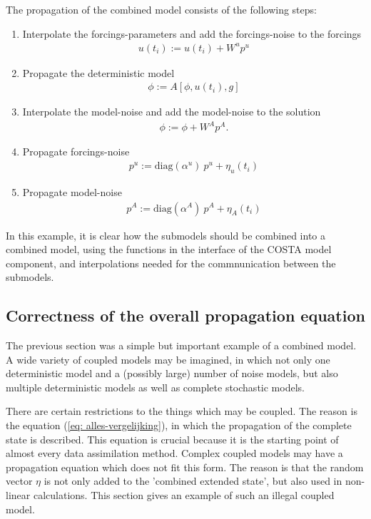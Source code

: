 \documentclass[a4paper,12pt]{article}
\begin{document}
The propagation of the combined model consists of the following steps:
\begin{enumerate}
 \item Interpolate the forcings-parameters and add the forcings-noise to
       the forcings
    \begin{eqnarray}
       u(t_i) := u(t_i) + W^u p^u
    \end{eqnarray}
 \item Propagate the deterministic model
    \begin{eqnarray}
       \phi := A[\phi,u(t_i),g]
    \end{eqnarray}
 \item Interpolate the model-noise and add the model-noise to the solution 
    \begin{eqnarray}
       \phi := \phi + W^A p^A. 
    \end{eqnarray}
 \item Propagate forcings-noise
    \begin{eqnarray}
       p^u := \mbox{diag}(\alpha^u)~p^u + \eta_u(t_i)
    \end{eqnarray}
 \item Propagate model-noise
    \begin{eqnarray}
       p^A := \mbox{diag}(\alpha^A)~p^A + \eta_A(t_i)
    \end{eqnarray}
\end{enumerate}
In this example, it is clear how the submodels should be combined into a 
combined model, using the functions in the interface of the COSTA model
component, and interpolations needed for the commnunication between the
submodels.

\subsection{Correctness of the overall propagation equation}
The previous section was a simple but important example of a combined model. 
A wide variety of coupled models may be imagined, in which not only one 
deterministic model and a (possibly large) number of noise models, but also
multiple deterministic models as well as complete stochastic models. 

There are certain restrictions to the things which may be coupled. The
reason is the equation (\ref{eq: alles-vergelijking}), in which 
the propagation of the complete state is described. This equation is
crucial because it is the starting point of almost every data assimilation
method. Complex coupled models may have a propagation equation which does
not fit this form. The reason is that the random vector $\eta$ is not only 
added to the 'combined extended state', but also used in non-linear
calculations. This section gives an example of such an illegal coupled 
model. 
\end{document}
